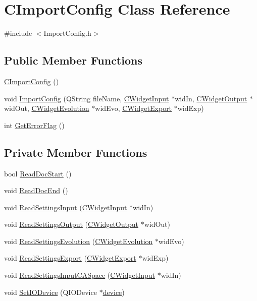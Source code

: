 \hypertarget{classCImportConfig}{
\section{CImportConfig Class Reference}
\label{classCImportConfig}
}


{\ttfamily \#include $<$ImportConfig.h$>$}\subsection*{Public Member Functions}
\begin{DoxyCompactItemize}
\item 
\hyperlink{classCImportConfig_a97be714a5a5005731dc6938243c26796}{CImportConfig} ()
\item 
void \hyperlink{classCImportConfig_af4d96bf6b02540218f0210c196361bb3}{ImportConfig} (QString fileName, \hyperlink{classCWidgetInput}{CWidgetInput} $\ast$widIn, \hyperlink{classCWidgetOutput}{CWidgetOutput} $\ast$widOut, \hyperlink{classCWidgetEvolution}{CWidgetEvolution} $\ast$widEvo, \hyperlink{classCWidgetExport}{CWidgetExport} $\ast$widExp)
\item 
int \hyperlink{classCImportConfig_a3a92df143f5a70a40e7c28cbea76b0bd}{GetErrorFlag} ()
\end{DoxyCompactItemize}
\subsection*{Private Member Functions}
\begin{DoxyCompactItemize}
\item 
bool \hyperlink{classCImportConfig_a0397bcf324cc2938b413bfb9670e05a4}{ReadDocStart} ()
\item 
void \hyperlink{classCImportConfig_a0b08262d21fcf9995846c599bac9357c}{ReadDocEnd} ()
\item 
void \hyperlink{classCImportConfig_ab1d9c03db12994e62f95195f7a280bb9}{ReadSettingsInput} (\hyperlink{classCWidgetInput}{CWidgetInput} $\ast$widIn)
\item 
void \hyperlink{classCImportConfig_a98422fe598b7ef8e64fd583133670566}{ReadSettingsOutput} (\hyperlink{classCWidgetOutput}{CWidgetOutput} $\ast$widOut)
\item 
void \hyperlink{classCImportConfig_abf7928fbebdd79cf6334fd0c9c2975bc}{ReadSettingsEvolution} (\hyperlink{classCWidgetEvolution}{CWidgetEvolution} $\ast$widEvo)
\item 
void \hyperlink{classCImportConfig_adeba1887e4095c43cc3ea4ada724a75a}{ReadSettingsExport} (\hyperlink{classCWidgetExport}{CWidgetExport} $\ast$widExp)
\item 
void \hyperlink{classCImportConfig_a90f26f48dd036015d6dbe9ca70c255df}{ReadSettingsInputCASpace} (\hyperlink{classCWidgetInput}{CWidgetInput} $\ast$widIn)
\item 
void \hyperlink{classCImportConfig_a725b2dfb494c97728b6b53ef8b4d92e9}{SetIODevice} (QIODevice $\ast$\hyperlink{classCImportConfig_ae3c7a8257039bee979ad0380a25986e4}{device})
\end{DoxyCompactItemize}
